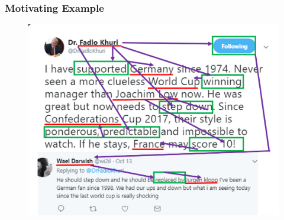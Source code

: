 \documentclass[xcolor=table]{beamer}
\newcommand{\itodo}[1]{\todo[inline]{#1}}
\begin{document}

\begin{frame}
\frametitle{Motivating Example}
\begin{figure}[!htb]
   \centering
    \includegraphics[scale=0.5]{img0004_3.png}
    
\end{figure}

\end{frame}

\end{document}
